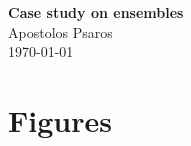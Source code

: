 

\usepackage{subcaption}

\usepackage[english]{babel}
\usepackage{blindtext}

	
	\sloppy
	
	\begin{center}	
		\Large
		\textbf{Case study on ensembles}\\
		\large
		Apostolos Psaros\\	
		\today
	\end{center}
	\vskip 0.5in
	
\section{Figures}
\blindtext

